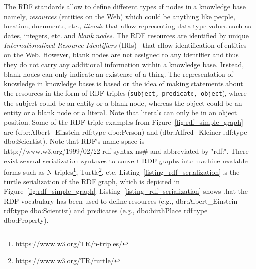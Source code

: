 The RDF standards allow to define different types of nodes in a knowledge base namely, \textit{resources} (entities on the Web) which could be anything like people, location, documents, etc., \textit{literals} that allow representing data type values such as dates, integers, etc. and \textit{blank nodes}. %
The RDF resources are identified by unique \textit{Internationalized Resource Identifiers} (IRIs)~\cite{DBLP:journals/rfc/rfc3987} that allow identification of entities on the Web. However, blank nodes are not assigned to any identifier and thus they do not carry any additional information within a knowledge base. Instead, blank nodes can only indicate an existence of a thing. The representation of knowledge in knowledge bases is based on the idea of making statements about the resources in the form of RDF triples (\texttt{subject,  predicate, object}), where the subject could be an entity or a blank node, whereas the object could be an entity or a blank node or a literal. Note that literals can only be in an object position. Some of the RDF triple examples from Figure~\ref{fig:rdf_simple_graph} are (dbr:Albert\_Einstein rdf:type dbo:Person) and (dbr:Alfred\_Kleiner rdf:type dbo:Scientist). Note that RDF's name space is \\http://www.w3.org/1999/02/22-rdf-syntax-ns\# and abbreviated by "rdf:". There exist several serialization syntaxes to convert RDF graphs into machine readable forms such as N-triples\footnote{https://www.w3.org/TR/n-triples/}, Turtle\footnote{https://www.w3.org/TR/turtle/}, etc. Listing~\ref{listing_rdf_serialization} is the turtle serialization of the RDF graph, which is depicted in Figure~\ref{fig:rdf_simple_graph}.  Listing~\ref{listing_rdf_serialization} shows that the RDF vocabulary has been used to define resources (e.g., \textsf{dbr:Albert\_Einstein rdf:type dbo:Scientist}) and predicates (e.g., \textsf{dbo:birthPlace rdf:type dbo:Property}).



